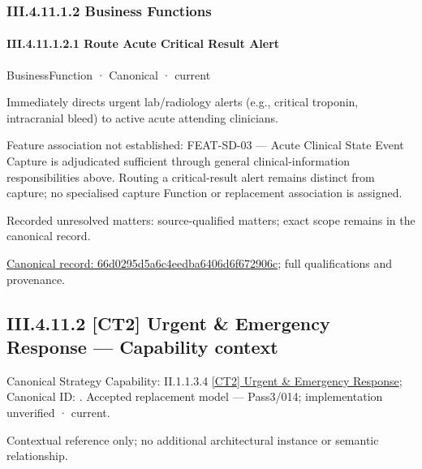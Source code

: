 \subsubsection*{III.4.11.1.2 Business Functions}
\label{navigation:III.4.11.1.2}

\paragraph*{III.4.11.1.2.1 Route Acute Critical Result Alert}
\label{navigation:III.4.11.1.2.1}

\label{element:66d0295d5a6c4eedba6406d6f672906c}
{\small BusinessFunction · Canonical · current}\par

Immediately directs urgent lab/radiology alerts (e.g., critical troponin, intracranial bleed) to active acute attending clinicians.



Feature association not established: FEAT-SD-03 — Acute Clinical State Event Capture is adjudicated sufficient through general clinical-information responsibilities above. Routing a critical-result alert remains distinct from capture; no specialised capture Function or replacement association is assigned.


{\small Recorded unresolved matters: source-qualified matters; exact scope remains in the canonical record.}\par
{\footnotesize \href{../../../../../../../continuum/business/business-function/66d0295d5a6c4eedba6406d6f672906c.md}{Canonical record: 66d0295d5a6c4eedba6406d6f672906c}; full qualifications and provenance.}\par
\subsection*{III.4.11.2 [CT2] Urgent \& Emergency Response — Capability context}
\label{navigation:III.4.11.2}

{\small Canonical Strategy Capability: II.1.1.3.4 \hyperref[element:d6c40bcfc84a4b758530edcaabfbd0ca]{[CT2] Urgent \& Emergency Response}; Canonical ID: \texttt{}. Accepted replacement model — Pass3/014; implementation unverified · current.}\par
Contextual reference only; no additional architectural instance or semantic relationship.\par
